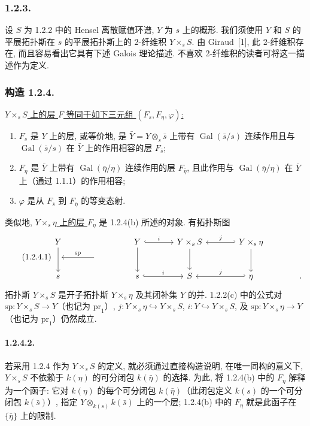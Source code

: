 \subsubsection*{1.2.3.}
设 $S$ 为 1.2.2 中的 Hensel 离散赋值环谱, $Y$ 为 $s$ 上的概形. 我们须使用 $Y$ 和 $S$ 的平展拓扑斯在 $s$ 的平展拓扑斯上的 2-纤维积 $Y\times_sS$. 由 Giraud~[1], 此 2-纤维积存在, 而且容易看出它具有下述 Galois 理论描述. 不喜欢 2-纤维积的读者可将这一描述作为定义.

\subsubsection*{构造 1.2.4.}
\underline{$Y\times_sS$ 上的层 $F$ 等同于如下三元组 $(F_s,F_\eta,\varphi)$:}
\begin{enumerate}[label=(\alph*)]
\item $F_s$ 是 $Y$ 上的层, 或等价地, 是 $\bar Y=Y\otimes_s\bar s$ 上带有 $\operatorname{Gal}(\bar s/s)$ 连续作用且与 $\operatorname{Gal}(\bar s/s)$ 在 $\bar Y$ 上的作用相容的层 $F_{\bar s}$;

\item $F_\eta$ 是 $\bar Y$ 上带有 $\operatorname{Gal}(\bar\eta/\eta)$ 连续作用的层 $F_{\bar\eta}$, 且此作用与 $\operatorname{Gal}(\bar\eta/\eta)$ 在 $\bar Y$ 上（通过 1.1.1）的作用相容;

\item $\varphi$ 是从 $F_{\bar s}$ 到 $F_{\bar\eta}$ 的等变态射.
\end{enumerate}
类似地, \underline{$Y\times_s\eta$ 上的层 $F_\eta$} 是 1.2.4(b) 所述的对象. 有拓扑斯图
\begin{equation}\tag{1.2.4.1}
\begin{tikzcd}[column sep=large, row sep=small]
Y \arrow[dd] & {} & Y \arrow[r, hook, "i"] \arrow[dd]
  & Y\times_sS \arrow[dd]
  & Y\times_s\eta \arrow[l, hook', "j"'] \arrow[dd] & {} \\
{} & {} \arrow[l, "\mathrm{sp}"'] & {} & {} & {} & {} \\
s & {} & s \arrow[r, hook, "i"] & S
  & \eta \arrow[l, hook', "j"'] & {.}
\end{tikzcd}
\end{equation}
拓扑斯 $Y\times_sS$ 是开子拓扑斯 $Y\times_s\eta$ 及其闭补集 $Y$ 的并. 1.2.2(c) 中的公式对 $\mathrm{sp}:Y\times_sS\longrightarrow Y$（也记为 $\mathrm{pr}_1$）, $j:Y\times_s\eta\hookrightarrow Y\times_sS$, $i:Y\hookrightarrow Y\times_sS$, 及 $\mathrm{sp}:Y\times_s\eta\longrightarrow Y$（也记为 $\mathrm{pr}_1$）仍然成立.

\paragraph{1.2.4.2.}
若采用 1.2.4 作为 $Y\times_sS$ 的定义, 就必须通过直接构造说明, 在唯一同构的意义下, $Y\times_sS$ 不依赖于 $k(\eta)$ 的可分闭包 $k(\bar\eta)$ 的选择. 为此, 将 1.2.4(b) 中的 $F_\eta$ 解释为一个函子: 它对 $k(\eta)$ 的每个可分闭包 $k(\bar\eta)$（此闭包定义 $k(s)$ 的一个可分闭包 $k(\bar s)$）, 指定 $Y\otimes_{k(s)}k(\bar s)$ 上的一个层; 1.2.4(b) 中的 $F_\eta$ 就是此函子在 $\{\bar\eta\}$ 上的限制.
